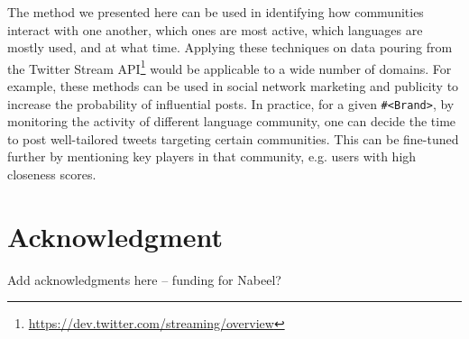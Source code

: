 \documentclass[conference]{IEEEtran}
\begin{document}
The method we presented here can be used in identifying how
communities interact with one another, which ones are most active,
which languages are mostly used, and at what time. Applying these
techniques on data pouring from the Twitter Stream
API\footnote{\url{https://dev.twitter.com/streaming/overview}} would
be applicable to a wide number of domains. For example, these methods
can be used in social network marketing and publicity to increase the
probability of influential posts. In practice, for a given
{\texttt{\#<Brand>}}, by monitoring the activity of different language
community, one can decide the time to post well-tailored tweets
targeting certain communities. This can be fine-tuned further by
mentioning key players in that community, e.g. users with high
closeness scores.


\section*{Acknowledgment}

Add acknowledgments here -- funding for Nabeel?







\end{document}
